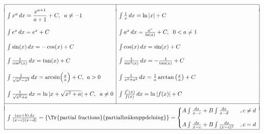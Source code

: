 \documentclass{article}
\begin{document}
\medskip

$\begin{array}{|l|l|}\hline   & \\*[-5pt]
\int x^a\,dx=\dfrac{x^{a+1}}{a+1}+C, \hspace{2 mm} a\neq -1 & \int\frac{1}{x}\,dx=\ln\vert x\vert +C \\ & \\ \int e^x\,dx=e^x+C &\int a^x\,dx=\frac{a^x}{\ln(a)}+C, \hspace{2 mm} 0<a\neq 1 \\ & \\ \int \sin(x)\,dx=-\cos(x)+C &\int\cos(x)\,dx=\sin(x)+C \\ & \\ \int \frac{1}{\cos^2(x)}\,dx=\tan(x)+C &\int\frac{1}{\sin^2(x)}\,dx=-\frac{1}{\tan(x)}+C \\ & \\ \int\frac{1}{\sqrt{a^2-x^2}}\,dx=\arcsin\Bigl(\frac xa\Bigr)+C,\;\, a>0 &\int\frac{1}{x^2+a^2}\,dx=\frac{1}{a}\arctan\left(\frac{x}{a}\right)+C\\ &\\ \int\frac{1}{\sqrt{x^2+a}}\,dx=\ln\vert x+\sqrt{x^2+a}\vert+C,\hspace{2 mm}a\neq 0 &\int\frac{f'(x)}{f(x)}\,dx=\ln\vert f(x)\vert +C
\\*[10pt]
\cline{1-2}
\multicolumn{2}{|l|}{}\\*[-7pt]
\multicolumn{2}{|l|}{

\int\frac{(ax+b)\,dx}{(x-c)(x-d)}
=\{\text{\Tr{partial fractions}{partialbråksuppdelning}}\}=
\begin{cases}

A\int\frac{dx}{x-c} +B\int\frac{dx}{x-d} &, c\neq d \\*[10pt]

A\int\frac{dx}{x-c} +B\int\frac{dx}{(x-c)^2} &, c=d
\end{cases}
}\\
\hline
\end{array}
$

\subsection*{}%
\end{document}
